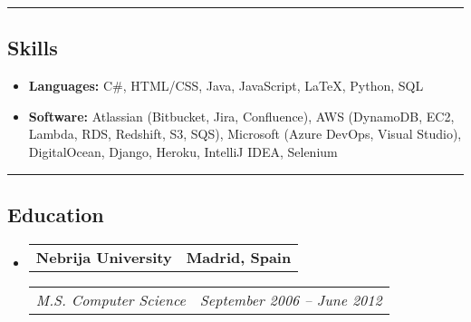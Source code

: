 \documentclass[11pt,letterpaper]{article}
\makeatletter
\newcommand{\headerrow}[2]
{\begin{tabular*}{\linewidth}{l@{\extracolsep{\fill}}r}
#1 &
#2 \\
\end{tabular*}}
\makeatother
\begin{document}
\hrule
\vspace{-1em}
\subsection*{\Large Skills}

\begin{itemize}[leftmargin=1em,noitemsep]
	\item \textbf{Languages:}
	      C\#, HTML/CSS, Java, JavaScript, \LaTeX, Python, SQL
	\item \textbf{Software:}
	      Atlassian (Bitbucket, Jira, Confluence), AWS (DynamoDB, EC2, Lambda, RDS, Redshift, S3, SQS), Microsoft (Azure DevOps, Visual Studio), DigitalOcean, Django, Heroku, IntelliJ IDEA, Selenium
\end{itemize}

\hrule
\vspace{-1em}
\subsection*{\Large Education}

\begin{itemize}[leftmargin=1em]
	\parskip=0.1em
		
	\item
	      \headerrow
	      {\textbf{Nebrija University}}
	      {\textbf{Madrid, Spain}}
	      \headerrow
	      {\emph{M.S. Computer Science}}
	      {\emph{September 2006 -- June 2012}}
	      	      
\end{itemize}
\end{document}
